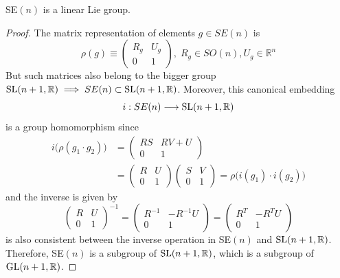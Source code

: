   \begin{proposition}
    SE$(n)$ is a linear Lie group. 
  \end{proposition}
  \begin{proof}
    The matrix representation of elements $g \in SE(n)$ is 
    \begin{equation}
      \rho(g) \equiv \begin{pmatrix}
      R_g & U_g \\ 0 & 1
      \end{pmatrix}, \; R_g \in SO(n), U_g \in \mathbb{R}^n
    \end{equation}
    But such matrices also belong to the bigger group $\operatorname{SL}(n+1, \mathbb{R}) \implies SE(n) \subset \operatorname{SL}(n+1, \mathbb{R})$. Moreover, this canonical embedding 
    \begin{equation}
      i: SE(n) \longrightarrow \operatorname{SL}(n+1, \mathbb{R})
    \end{equation}
    is a group homomorphism since
    \begin{align*}
      i\big( \rho(g_1 \cdot g_2) \big) & = \begin{pmatrix}
      RS & RV + U \\ 0 & 1
      \end{pmatrix} \\
      & = \begin{pmatrix}
      R & U \\ 0 & 1
      \end{pmatrix} \begin{pmatrix}
      S & V \\ 0 & 1
      \end{pmatrix} = \rho \big( i(g_1) \cdot i(g_2) \big) 
    \end{align*}
    and the inverse is given by 
    \begin{equation}
      \begin{pmatrix}
      R & U \\ 0 & 1
      \end{pmatrix}^{-1} = \begin{pmatrix}
      R^{-1} & - R^{-1} U \\ 0 & 1
      \end{pmatrix} = \begin{pmatrix}
      R^T & - R^T U \\ 0 & 1
      \end{pmatrix}
    \end{equation}
    is also consistent between the inverse operation in SE$(n)$ and $\operatorname{SL}(n+1, \mathbb{R})$. Therefore, SE$(n)$ is a subgroup of $\operatorname{SL}(n+1, \mathbb{R})$, which is a subgroup of $\operatorname{GL}(n+1, \mathbb{R})$. 
  \end{proof}

